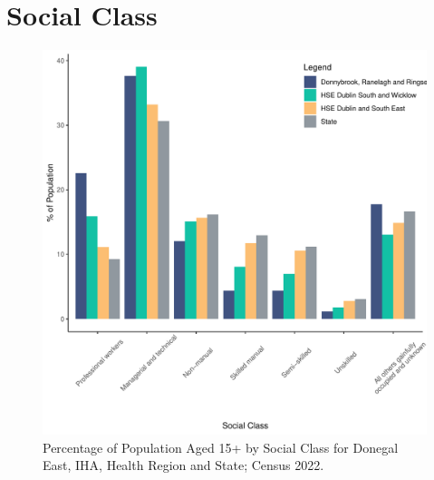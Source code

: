 \documentclass{article}
\begin{document}
\section{Social Class}\label{sect:SC}
\begin{figure}[H]
	\centering
	\includegraphics[width = 140mm]{../figures/SocialClassED.pdf}
	\caption{Percentage of Population Aged 15+ by Social Class for Donegal East, IHA, Health Region and State; Census 2022.}
	\label{fig:vbnv}
	\end{figure}
\end{document}
